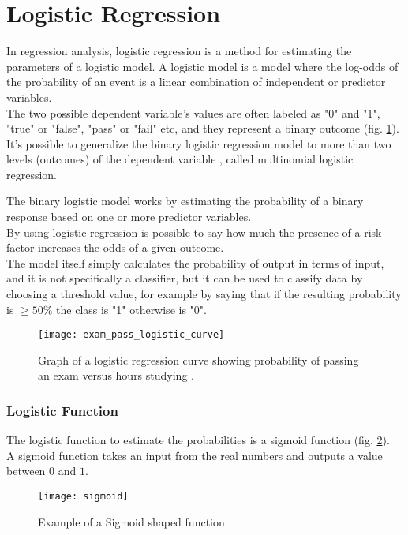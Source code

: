 \clearpage

\section{Logistic Regression} \label{logreg}
In regression analysis, logistic regression is a method for estimating the parameters of a logistic model. A logistic model is a model where the log-odds of the probability of an event is a linear combination of independent or predictor variables. \\
The two possible dependent variable's values are often labeled as "0" and "1", "true" or "false", "pass" or "fail" etc, and they represent a binary outcome (fig. \ref{fig:logistic_exam}). \\
It's possible to generalize the binary logistic regression model to more than two levels (outcomes) of the dependent variable \cite{wiki:logisticreg}, called multinomial logistic regression.

The binary logistic model works by estimating the probability of a binary response based on one or more predictor variables.\\
By using logistic regression is possible to say how much the presence of a risk factor increases the odds of a given outcome. \\
The model itself simply calculates the probability of output in terms of input, and it is not specifically a classifier, but it can be used to classify data by choosing a threshold value, for example by saying that if the resulting probability is $\ge 50\%$ the class is "1" otherwise is "0".

\begin{figure}[H]
	\centering
	\texttt{[image: exam\_pass\_logistic\_curve]}
	\caption{Graph of a logistic regression curve showing probability of passing an exam versus hours studying \cite{wiki:logisticreg}.}
	\label{fig:logistic_exam}
\end{figure}

\subsubsection{Logistic Function}
The logistic function to estimate the probabilities is a sigmoid function (fig. \ref{fig:sigmoid}). \\
A sigmoid function takes an input from the real numbers and outputs a value between $0$ and $1$.

\begin{figure}[H]
	\centering
	\texttt{[image: sigmoid]}
	\caption{Example of a Sigmoid shaped function}
	\label{fig:sigmoid}
\end{figure}

